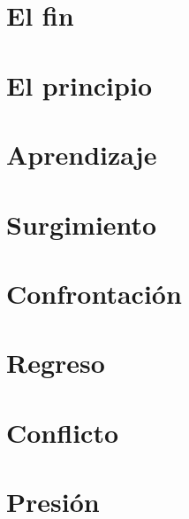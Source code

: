 \documentclass[11pt,a5paper]{book}
\title{\textbf{\Huge\thetitle}\\\textsc{\small\thesubtitle}}
\author{\textit{\theauthor}}
\date{}
\begin{document}


\frontmatter
\maketitle

\thispagestyle{empty}


\raggedcolumns
\tableofcontents
\flushcolumns

\mainmatter
{}
\chapter{El fin}\label{chapter:el_fin}


\chapter{El principio}\label{chapter:el_principio}


\chapter{Aprendizaje}\label{chapter:aprendizaje}


\chapter{Surgimiento}\label{chapter:surgimiento}


\chapter{Confrontación}\label{chapter:confrontacion}


\chapter{Regreso}\label{chapter:regreso}


\chapter{Conflicto}\label{chapter:conflicto}


\chapter{Presión}\label{chapter:presion}

\end{document}
